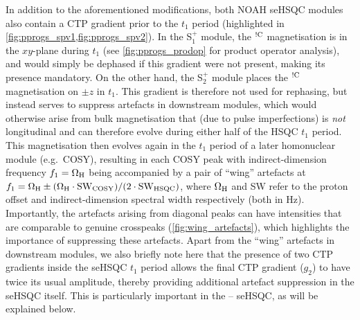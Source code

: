 \documentclass[11pt]{article}
\newcommand*{\noahSpa}{S$^+_1$}
\newcommand*{\noahSpb}{S$^+_2$}
\newcommand*{\hl}[1]{\textcolor{WildStrawberry}{#1}}
\newcommand*{\proton}{\ce{^{1}H}}
\newcommand*{\nitrogen}{\ce{^{15}N}}
\newcommand*{\magnnot}[1]{\ce{^1H}$^{!#1}$}
\begin{document}
\hl{
In addition to the aforementioned modifications, both NOAH seHSQC modules also contain a CTP gradient prior to the $t_1$ period (highlighted in \cref{fig:pprogs_spv1,fig:pprogs_spv2}).
    In the \noahSpa{} module, the \magnnot{\ce{C}} magnetisation is in the $xy$-plane during $t_1$ (see \cref{fig:pprogs_prodop} for product operator analysis), and would simply be dephased if this gradient were not present, making its presence mandatory.
On the other hand, the \noahSpb{} module places the \magnnot{\ce{C}} magnetisation on $\pm z$ in $t_1$.
This gradient is therefore not used for rephasing, but instead serves to suppress artefacts in downstream modules, which would otherwise arise from bulk magnetisation that (due to pulse imperfections) is \textit{not} longitudinal and can therefore evolve during either half of the HSQC $t_1$ period.
}
This magnetisation then evolves again in the $t_1$ period of a later homonuclear module (e.g.\ COSY), resulting in each COSY peak with indirect-dimension frequency $f_1 = \Omega_{\ce{H}}$ being accompanied by a pair of ``wing'' artefacts at $f_1 = \Omega_{\ce{H}} \pm (\Omega_{\ce{H}}\cdot\mathrm{SW_{COSY}})/(2\cdot \mathrm{SW_{HSQC}})$, where $\Omega_{\ce{H}}$ and SW refer to the proton offset and indirect-dimension spectral width respectively (both in Hz).
Importantly, the artefacts arising from diagonal peaks can have intensities that are comparable to genuine crosspeaks (\cref{fig:wing_artefacts}), which highlights the importance of suppressing these artefacts.
\hl{Apart from the ``wing'' artefacts in downstream modules,} we also briefly note here that the presence of two CTP gradients inside the seHSQC $t_1$ period allows the final CTP gradient ($g_2$) to have twice its usual amplitude, thereby providing additional artefact suppression in the seHSQC itself.
This is particularly important in the \nitrogen{}--\proton{} seHSQC, as will be explained below.
\end{document}
